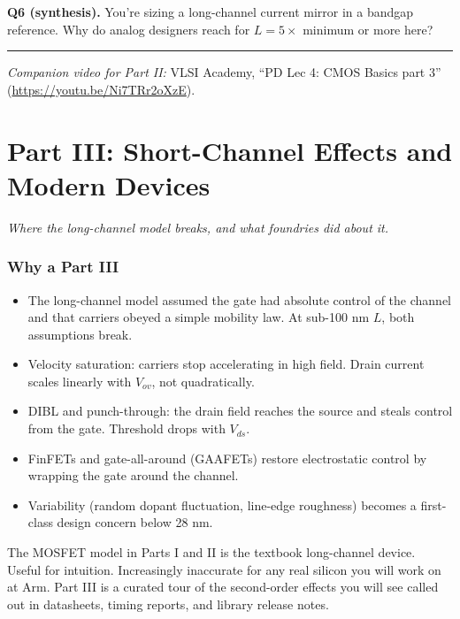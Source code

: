 \documentclass[11pt]{article}
\begin{document}
\textbf{Q6 (synthesis).} You're sizing a long-channel current mirror in a bandgap reference. Why do analog designers reach for $L = 5\times$ minimum or more here?

\vspace{0.5em}\hrule\vspace{0.5em}
\noindent\textit{Companion video for Part II:} VLSI Academy, ``PD Lec 4: CMOS Basics part 3'' (\url{https://youtu.be/Ni7TRr2oXzE}).

\part*{Part III: Short-Channel Effects and Modern Devices}
\textit{Where the long-channel model breaks, and what foundries did about it.}

\section{Why a Part III}

\begin{tldr}
\begin{itemize}[leftmargin=*]
\item The long-channel model assumed the gate had absolute control of the channel and that carriers obeyed a simple mobility law. At sub-100 nm $L$, both assumptions break.
\item Velocity saturation: carriers stop accelerating in high field. Drain current scales linearly with $V_{ov}$, not quadratically.
\item DIBL and punch-through: the drain field reaches the source and steals control from the gate. Threshold drops with $V_{ds}$.
\item FinFETs and gate-all-around (GAAFETs) restore electrostatic control by wrapping the gate around the channel.
\item Variability (random dopant fluctuation, line-edge roughness) becomes a first-class design concern below 28 nm.
\end{itemize}
\end{tldr}

The MOSFET model in Parts I and II is the textbook long-channel device. Useful for intuition. Increasingly inaccurate for any real silicon you will work on at Arm. Part III is a curated tour of the second-order effects you will see called out in datasheets, timing reports, and library release notes.
\end{document}
